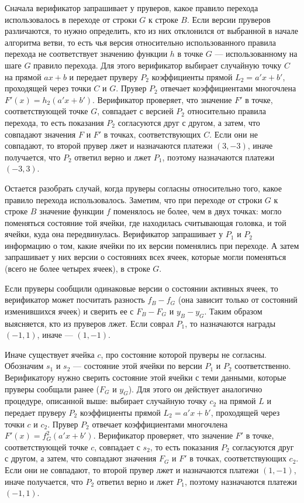\documentclass[14pt, a4paper]{extreport}
\begin{document}
        Сначала верификатор запрашивает у пруверов, какое правило перехода использовалось в переходе от строки $G$ к строке $B$. Если версии пруверов различаются, то нужно определить,
        кто из них отклонился от выбранной в начале алгоритма ветви, то есть чья версия относительно использованного правила перехода не соответствует значению функции $h$ в точке $G$ --- использованному на шаге $G$ правило перехода. Для этого верификатор выбирает случайную точку $C$ на прямой $a x + b$ и передает пруверу  $P_2$ коэффициенты прямой $L_2 = a'x + b'$, проходящей через точки $C$ и $G$. Прувер $P_2$ отвечает коэффициентами многочлена $F'(x) = h_2(a'x + b')$. Верификатор проверяет, что значение $F'$ в точке, соответствующей точке $G$, совпадает с версией $P_2$ относительно правила перехода, то есть показания $P_2$ согласуются друг с другом, а затем, что совпадают значения $F$ и $F'$ в точках, соответствующих $C$. Если они не совпадают, то второй прувер лжет и назначаются платежи $(3, -3)$, иначе получается, что $P_2$ ответил верно и лжет $P_1$, поэтому назначаются платежи $(-3, 3)$.

        Остается разобрать случай, когда пруверы согласны относительно того, какое правило перехода использовалось. Заметим, что при переходе от строки $G$ к строке $B$ значение функции $f$ поменялось не более, чем в двух точках: могло поменяться состояние той ячейки, где находилась считывающая головка, и той ячейки, куда она передвинулась. Верификатор запрашивает у $P_1$ и $P_2$ информацию о том, какие ячейки по их версии поменялись при переходе. А затем запрашивает у них версии о состояниях всех ячеек, которые могли поменяться (всего не более четырех ячеек), в строке $G$.

        Если пруверы сообщили одинаковые версии о состоянии активных ячеек, то верификатор может посчитать разность $f_B - f_G$ (она зависит только от состояний изменившихся ячеек) и сверить ее с $F_B - F_G$ и $y_B - y_G$. Таким образом выясняется, кто из пруверов лжет. Если соврал $P_1$, то назначаются награды $(-1, 1)$, иначе --- $(1, -1)$.

        Иначе существует ячейка $c$, про состояние которой пруверы не согласны. Обозначим $s_1$ и $s_2$ --- состояние этой ячейки по версии $P_1$ и $P_2$ соответственно. Верификатору нужно сверить состояние этой ячейки с теми данными, которые пруверы сообщали ранее ($F_G$ и $y_G$). Для этого он действует аналогично процедуре, описанной выше: выбирает случайную точку $c_2$ на прямой $L$ и передает пруверу $P_2$ коэффициенты прямой $L_2 = a'x + b'$, проходящей через точки $c$ и $c_2$. Прувер $P_2$ отвечает коэффициентами многочлена $F'(x) = f^2_G(a'x + b')$. Верификатор проверяет, что значение $F'$ в точке, соответствующей точке $c$, совпадает с $s_2$, то есть показания $P_2$ согласуются друг с другом, а затем, что совпадают значения $F_G$ и $F'$ в точках, соответствующих $c_2$. Если они не совпадают, то второй прувер лжет и назначаются платежи $(1, -1)$, иначе получается, что $P_2$ ответил верно и лжет $P_1$, поэтому назначаются платежи $(-1, 1)$.
\end{document}
